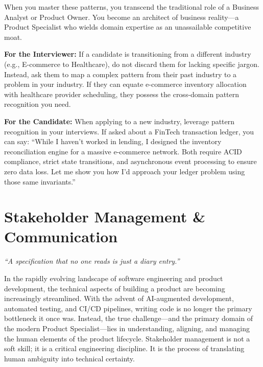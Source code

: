 \documentclass[
  11pt,
  openany,
  oneside]{book}
\renewenvironment{quote}{\begin{customquote}}{\end{customquote}}
\begin{document}
When you master these patterns, you transcend the traditional role of a
Business Analyst or Product Owner. You become an architect of business
reality---a Product Specialist who wields domain expertise as an
unassailable competitive moat.

\begin{quote}
\textbf{For the Interviewer:} If a candidate is transitioning from a
different industry (e.g., E-commerce to Healthcare), do not discard them
for lacking specific jargon. Instead, ask them to map a complex pattern
from their past industry to a problem in your industry. If they can
equate e-commerce inventory allocation with healthcare provider
scheduling, they possess the cross-domain pattern recognition you need.
\end{quote}

\begin{quote}
\textbf{For the Candidate:} When applying to a new industry, leverage
pattern recognition in your interviews. If asked about a FinTech
transaction ledger, you can say: ``While I haven't worked in lending, I
designed the inventory reconciliation engine for a massive e-commerce
network. Both require ACID compliance, strict state transitions, and
asynchronous event processing to ensure zero data loss. Let me show you
how I'd approach your ledger problem using those same invariants.''
\end{quote}

\chapter{Stakeholder Management \&
Communication}\label{stakeholder-management-communication}

\begin{quote}
\emph{``A specification that no one reads is just a diary entry.''}
\end{quote}

In the rapidly evolving landscape of software engineering and product
development, the technical aspects of building a product are becoming
increasingly streamlined. With the advent of AI-augmented development,
automated testing, and CI/CD pipelines, writing code is no longer the
primary bottleneck it once was. Instead, the true challenge---and the
primary domain of the modern Product Specialist---lies in understanding,
aligning, and managing the human elements of the product lifecycle.
Stakeholder management is not a soft skill; it is a critical engineering
discipline. It is the process of translating human ambiguity into
technical certainty.
\end{document}
